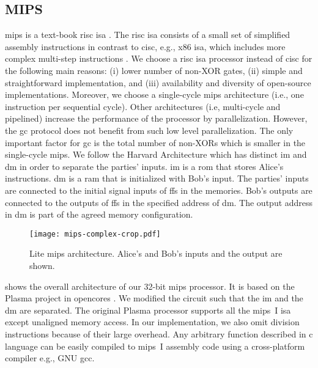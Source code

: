 \subsection{MIPS}\label{ssec:processor-mips}
\gls{mips} is a text-book \acrfull{risc} \acrshort{isa} \cite{kane1992mips}.
The \acrshort{risc} \acrshort{isa} consists of a small set of simplified assembly instructions in contrast to \acrfull{cisc}, e.g., x86 \acrshort{isa}, which includes more complex multi-step instructions \cite{hennessy2012computer}.
We choose a \acrshort{risc} \acrshort{isa} processor instead of \acrshort{cisc} for the following main reasons: (i) lower number of non-XOR gates, (ii) simple and straightforward implementation, and (iii) availability and diversity of open-source implementations.
Moreover, we choose a single-cycle \gls{mips} architecture (i.e., one instruction per sequential cycle).
Other architectures (i.e, multi-cycle and pipelined) increase the performance of the processor by parallelization.
However, the \acrshort{gc} protocol does not benefit from such low level parallelization.
The only important factor for \acrshort{gc} is the total number of non-XORs which is smaller in the single-cycle \gls{mips}.
We follow the Harvard Architecture which has distinct \acrfull{im} and \acrfull{dm} in order to separate the parties' inputs.
\acrshort{im} is a \acrfull{rom} that stores Alice's instructions.
\acrshort{dm} is a \acrfull{ram} that is initialized with Bob's input.
The parties' inputs are connected to the initial signal inputs of \acrshort{ff}s in the memories.
Bob's outputs are connected to the outputs of \acrshort{ff}s in the specified address of \acrshort{dm}.
The output address in \acrshort{dm} is part of the agreed memory configuration.

\begin{figure}
\centering
\texttt{[image: mips-complex-crop.pdf]}
\caption{Lite \gls{mips} architecture.
  Alice's and Bob's inputs and the output are shown.}\label{figure:mips}
\end{figure}

 shows the overall architecture of our 32-bit \gls{mips} processor.
It is based on the Plasma project in opencores \cite{rhoads2006plasma}.
We modified the circuit such that the \acrshort{im} and the \acrshort{dm} are separated.
The original Plasma processor supports all the \gls{mips}~I \acrshort{isa} except unaligned memory access.
In our implementation, we also omit division instructions because of their large overhead.
Any arbitrary function described in \gls{c} language can be easily compiled to \gls{mips}~I assembly code using a cross-platform compiler e.g., GNU gcc.

